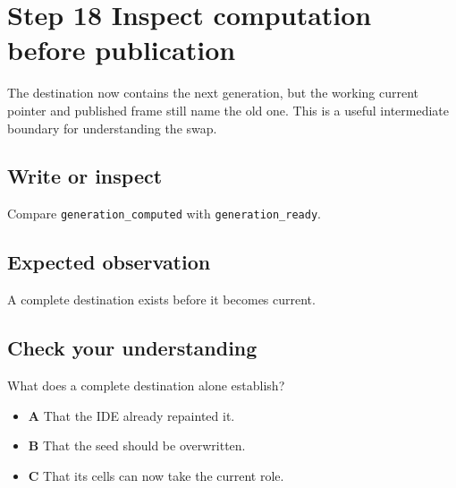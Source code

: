 \section{Step 18 Inspect computation before
  publication}\label{008-life-generations-s18-step-18-inspect-computation-before-publication}

The destination now contains the next generation, but the working
current pointer and published frame still name the old one. This is a
useful intermediate boundary for understanding the swap.

\subsection{Write or
  inspect}\label{008-life-generations-s18-write-or-inspect}

Compare \texttt{generation\_computed} with \texttt{generation\_ready}.

\subsection{Expected
  observation}\label{008-life-generations-s18-expected-observation}

A complete destination exists before it becomes current.

\subsection{Check your
  understanding}\label{008-life-generations-s18-check-your-understanding}

What does a complete destination alone establish?

\begin{itemize}
  \tightlist
  \item
        \textbf{A} That the IDE already repainted it.
  \item
        \textbf{B} That the seed should be overwritten.
  \item
        \textbf{C} That its cells can now take the current role.
\end{itemize}
